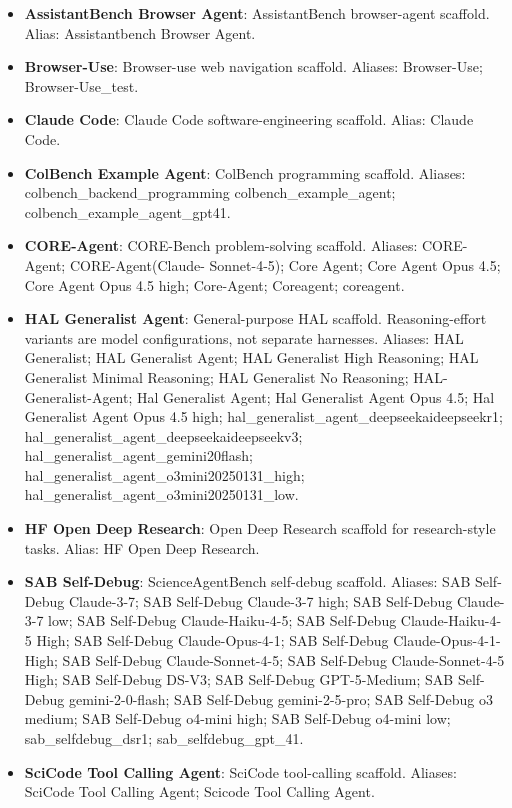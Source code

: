 \begingroup
\footnotesize
\begin{itemize}
\item \textbf{AssistantBench Browser Agent}: AssistantBench browser-agent scaffold. Alias: Assistantbench Browser Agent.
\item \textbf{Browser-Use}: Browser-use web navigation scaffold. Aliases: Browser-Use; Browser-Use\_test.
\item \textbf{Claude Code}: Claude Code software-engineering scaffold. Alias: Claude Code.
\item \textbf{ColBench Example Agent}: ColBench programming scaffold. Aliases: colbench\_backend\_programming colbench\_example\_agent; colbench\_example\_agent\_gpt41.
\item \textbf{CORE-Agent}: CORE-Bench problem-solving scaffold. Aliases: CORE-Agent; CORE-Agent(Claude- Sonnet-4-5); Core Agent; Core Agent Opus 4.5; Core Agent Opus 4.5 high; Core-Agent; Coreagent; coreagent.
\item \textbf{HAL Generalist Agent}: General-purpose HAL scaffold. Reasoning-effort variants are model configurations, not separate harnesses. Aliases: HAL Generalist; HAL Generalist Agent; HAL Generalist High Reasoning; HAL Generalist Minimal Reasoning; HAL Generalist No Reasoning; HAL-Generalist-Agent; Hal Generalist Agent; Hal Generalist Agent Opus 4.5; Hal Generalist Agent Opus 4.5 high; hal\_generalist\_agent\_deepseekaideepseekr1; hal\_generalist\_agent\_deepseekaideepseekv3; hal\_generalist\_agent\_gemini20flash; hal\_generalist\_agent\_o3mini20250131\_high; hal\_generalist\_agent\_o3mini20250131\_low.
\item \textbf{HF Open Deep Research}: Open Deep Research scaffold for research-style tasks. Alias: HF Open Deep Research.
\item \textbf{SAB Self-Debug}: ScienceAgentBench self-debug scaffold. Aliases: SAB Self-Debug Claude-3-7; SAB Self-Debug Claude-3-7 high; SAB Self-Debug Claude-3-7 low; SAB Self-Debug Claude-Haiku-4-5; SAB Self-Debug Claude-Haiku-4-5 High; SAB Self-Debug Claude-Opus-4-1; SAB Self-Debug Claude-Opus-4-1-High; SAB Self-Debug Claude-Sonnet-4-5; SAB Self-Debug Claude-Sonnet-4-5 High; SAB Self-Debug DS-V3; SAB Self-Debug GPT-5-Medium; SAB Self-Debug gemini-2-0-flash; SAB Self-Debug gemini-2-5-pro; SAB Self-Debug o3 medium; SAB Self-Debug o4-mini high; SAB Self-Debug o4-mini low; sab\_selfdebug\_dsr1; sab\_selfdebug\_gpt\_41.
\item \textbf{SciCode Tool Calling Agent}: SciCode tool-calling scaffold. Aliases: SciCode Tool Calling Agent; Scicode Tool Calling Agent.

\end{itemize}
